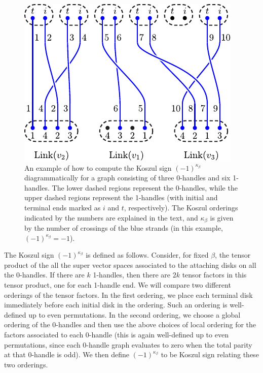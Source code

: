 \begin{figure} 
\centering
\includegraphics{KoszulFig.pdf} 
\caption{\label{KoszulFig} 
An example of how to compute the Koszul sign $(-1)^{\kappa_\beta}$ diagrammatically  
for a graph consisting of three 0-handles and six 1-handles. 
The lower dashed regions represent the 0-handles, while the upper dashed regions 
represent the 1-handles (with initial and terminal ends marked as $i$ and $t$, respectively). 
The Koszul orderings indicated by the numbers are explained in the text, and 
$\kappa_\beta$ is given by the number of crossings of the blue strands (in this example, 
$(-1)^{\kappa_\beta}=-1$).
}
\end{figure}


The Koszul sign $(-1)^{\kappa_\beta}$ is defined as follows.
Consider, for fixed $\beta$, the tensor product of the all the super vector spaces
associated to the attaching disks on all the 0-handles.
If there are $k$ 1-handles, then there are $2k$ tensor factors in this tensor product, one 
for each 1-handle end. 
We will compare two different orderings of the tensor factors.
In the first ordering, we place each terminal disk immediately before each initial disk in the ordering.
Such an ordering is well-defined up to even permutations.
In the second ordering, 
we choose a global ordering of the 0-handles and then
use the above choices of local ordering for the factors associated to
each 0-handle
(this is again well-defined up to even permutations, since each 0-handle graph evaluates to zero when the total
parity at that 0-handle is odd).
We then define $(-1)^{\kappa_\beta}$ to be Koszul sign relating these two orderings. 

